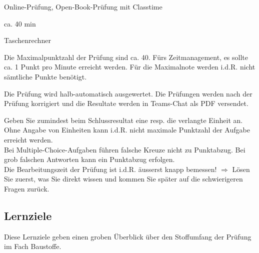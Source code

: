 \begin{description}[leftmargin=!,labelwidth=\widthof{Hinweise zur Bearbeitung...},font=\normalfont]
\item [Prüfungsmodus] Online-Prüfung, Open-Book-Prüfung mit Classtime
\item  [Prüfungsdauer] ca. 40 min
\item [Empfohlene Hilfsmittel] Taschenrechner
\item [Anzahl Punkte] Die Maximalpunktzahl der Prüfung sind ca. 40.  Fürs Zeitmanagement, es sollte ca. 1 Punkt pro Minute erreicht werden. Für die Maximalnote werden i.d.R. nicht sämtliche Punkte benötigt.
\item [Bewertung] Die Prüfung wird halb-automatisch ausgewertet. Die Prüfungen werden nach der Prüfung korrigiert und die Resultate werden in Teams-Chat als PDF versendet.
\item [Hinweise zur Bearbeitung] Geben Sie zumindest beim Schlussresultat eine resp. die verlangte Einheit an. Ohne Angabe von Einheiten kann i.d.R. nicht maximale Punktzahl der Aufgabe erreicht werden. \\ Bei Multiple-Choice-Aufgaben führen falsche Kreuze nicht zu Punktabzug. Bei grob falschen Antworten kann ein Punktabzug erfolgen. \\ Die Bearbeitungszeit der Prüfung ist i.d.R. äusserst knapp bemessen! $\Rightarrow$ Lösen Sie zuerst, was Sie direkt wissen und kommen Sie später auf die schwierigeren Fragen zurück.
\end{description}



\subsection*{Lernziele}
Diese Lernziele geben einen groben Überblick über den Stoffumfang der \nrPruefung\xspace Prüfung im Fach Baustoffe.

%




%
%
%
%






